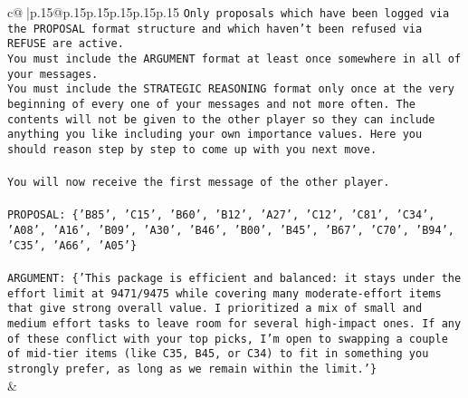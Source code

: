 \documentclass{article}
\begin{document}
{\begin{supertabular}{c@{$\;$}|p{.15\linewidth}@{}p{.15\linewidth}p{.15\linewidth}p{.15\linewidth}p{.15\linewidth}p{.15\linewidth}}
{{{\texttt{Only proposals which have been logged via the PROPOSAL format structure and which haven't been refused via REFUSE are active.} \\
\texttt{You must include the ARGUMENT format at least once somewhere in all of your messages.} \\
\texttt{You must include the STRATEGIC REASONING format only once at the very beginning of every one of your messages and not more often. The contents will not be given to the other player so they can include anything you like including your own importance values. Here you should reason step by step to come up with you next move.} \\
\\ 
\texttt{You will now receive the first message of the other player.} \\
\\ 
\texttt{PROPOSAL: \{'B85', 'C15', 'B60', 'B12', 'A27', 'C12', 'C81', 'C34', 'A08', 'A16', 'B09', 'A30', 'B46', 'B00', 'B45', 'B67', 'C70', 'B94', 'C35', 'A66', 'A05'\}} \\
\\ 
\texttt{ARGUMENT: \{'This package is efficient and balanced: it stays under the effort limit at 9471/9475 while covering many moderate{-}effort items that give strong overall value. I prioritized a mix of small and medium effort tasks to leave room for several high{-}impact ones. If any of these conflict with your top picks, I’m open to swapping a couple of mid{-}tier items (like C35, B45, or C34) to fit in something you strongly prefer, as long as we remain within the limit.'\}} \\
            }
        }
    }
    & \\ \\


\end{supertabular}}
\end{document}
